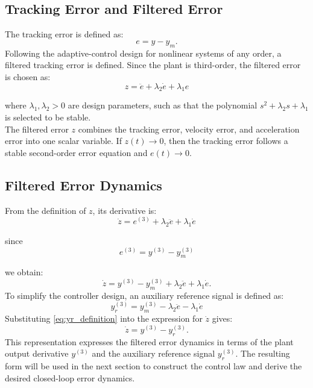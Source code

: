\subsection{Tracking Error and Filtered Error}

The tracking error is defined as:
\begin{equation}
e = y-y_m.
\end{equation}
Following the adaptive-control design for nonlinear systems of any order, a filtered tracking error is defined. Since the plant is third-order, the filtered error is chosen as:
\begin{equation}
z
=
\ddot{e}
+
\lambda_2\dot{e}
+
\lambda_1 e
\label{eq:filtered_error}
\end{equation}

where \(\lambda_1,\lambda_2>0\) are design parameters, such as that the polynomial
$
s^2+\lambda_2s+\lambda_1
$
is selected to be stable.
\\

\noindent The filtered error \(z\) combines the tracking error, velocity error, and acceleration error into one scalar variable. If \(z(t)\rightarrow0\), then the tracking error follows a stable second-order error equation and \(e(t)\rightarrow0\).

\subsection{Filtered Error Dynamics}

From the definition of \(z\), its derivative is:
\begin{equation}
\dot{z}
=
e^{(3)}
+
\lambda_2\ddot{e}
+
\lambda_1\dot{e}
\end{equation}

since
\begin{equation}
e^{(3)}
=
y^{(3)}
-
y_m^{(3)}
\end{equation}

we obtain:
\begin{equation}
\dot{z}
=
y^{(3)}
-
y_m^{(3)}
+
\lambda_2\ddot{e}
+
\lambda_1\dot{e}.
\end{equation}
To simplify the controller design, an auxiliary reference signal is defined as:
\begin{equation}
y_r^{(3)}
=
y_m^{(3)}
-
\lambda_2\ddot{e}
-
\lambda_1\dot{e}
\label{eq:yr_definition}
\end{equation}
Substituting \eqref{eq:yr_definition} into the expression for \(\dot{z}\) gives:
\begin{equation}
\dot{z}
=
y^{(3)}
-
y_r^{(3)}.
\label{eq:z_dot_compact}
\end{equation}
This representation expresses the filtered error dynamics in terms of the plant output derivative \(y^{(3)}\) and the auxiliary reference signal \(y_r^{(3)}\). The resulting form will be used in the next section to construct the control law and derive the desired closed-loop error dynamics.

